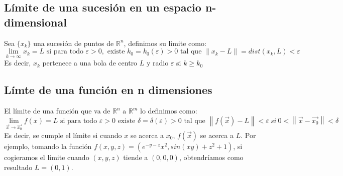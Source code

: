 \documentclass[11pt]{article}
\providecommand{\norm}[1]{\left\lVert #1 \right \rVert}
\providecommand{\norm}[1]{\left\lVert #1 \right \rVert}
\newcommand{\R}{\mathbb{R}}
\theoremstyle{plain}
\begin{document}
        \subsection{Límite de una sucesión en un espacio n-dimensional} %
        \label{sub:límite_de_una_sucesión_en_un_espacio_n_dimensional}
            Sea $\{x_k\}$ una sucesión de puntos de $\R^n$, definimos su límite como:
            \begin{equation}
                \lim_{k\to\infty} x_k = L \text{ si para todo } \varepsilon > 0, \text{ existe } k_0=k_0(\varepsilon)>0\text{ tal que } \norm{x_k - L} = dist(x_k,L)<\varepsilon
            \end{equation}
            Es decir, $x_k$ pertenece a una bola de centro $L$ y radio $\varepsilon$ si $k\ge k_0$
        \subsection{Límte de una función en n dimensiones} %
        \label{sub:límte_de_una_función_en_n_dimensiones}   
            El límite de una función que va de $\R^n$ a $\R^m$ lo definimos como:
            \begin{equation}
                \lim_{\vec{x}\to\vec{x_0}} f(x) = L \text{ si para todo } \varepsilon>0 \text{ existe } \delta = \delta(\varepsilon) > 0 \text{ tal que } \norm{f(\vec{x}) - L}<\varepsilon \ si \ 0<\norm{\vec{x}-\vec{x_0}}<\delta
            \end{equation}
            Es decir, se cumple el límite si cuando $x$ se acerca a $x_0$, $f(\vec{x})$ se acerca a $L$. Por ejemplo, tomando la función $f(x,y,z) = (e^{-y-z}x^2,sin(xy)+z^2+1)$, si cogieramos el límite cuando $(x,y,z)$ tiende a $(0,0,0)$, obtendríamos como resultado $L = (0,1)$.\\
\end{document}
